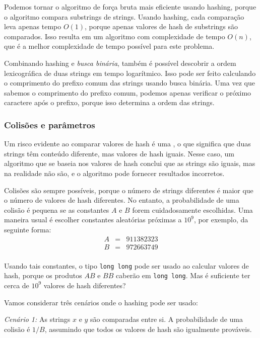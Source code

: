Podemos tornar o algoritmo de força bruta mais eficiente usando hashing, porque o algoritmo compara substrings de strings. Usando hashing, cada comparação leva apenas tempo $O(1)$, porque apenas valores de hash de substrings são comparados. Isso resulta em um algoritmo com complexidade de tempo $O(n)$, que é a melhor complexidade de tempo possível para este problema.

Combinando hashing e \emph{busca binária}, também é possível descobrir a ordem lexicográfica de duas strings em tempo logarítmico. Isso pode ser feito calculando o comprimento do prefixo comum das strings usando busca binária. Uma vez que sabemos o comprimento do prefixo comum, podemos apenas verificar o próximo caractere após o prefixo, porque isso determina a ordem das strings.

\subsubsection*{Colisões e parâmetros}


Um risco evidente ao comparar valores de hash é uma , o que significa que duas strings têm conteúdo diferente, mas valores de hash iguais. Nesse caso, um algoritmo que se baseia nos valores de hash conclui que as strings são iguais, mas na realidade não são, e o algoritmo pode fornecer resultados incorretos.

Colisões são sempre possíveis, porque o número de strings diferentes é maior que o número de valores de hash diferentes. No entanto, a probabilidade de uma colisão é pequena se as constantes $A$ e $B$ forem cuidadosamente escolhidas. Uma maneira usual é escolher constantes aleatórias próximas a $10^9$, por exemplo, da seguinte forma:
\[
\begin{array}{lcl}
A & = & 911382323 \\
B & = & 972663749 \\
\end{array}
\]

Usando tais constantes, o tipo \texttt{long long} pode ser usado ao calcular valores de hash, porque os produtos $AB$ e $BB$ caberão em \texttt{long long}. Mas é suficiente ter cerca de $10^9$ valores de hash diferentes?

Vamos considerar três cenários onde o hashing pode ser usado:

\textit{Cenário 1:} As strings $x$ e $y$ são comparadas entre si. A probabilidade de uma colisão é $1/B$, assumindo que todos os valores de hash são igualmente prováveis.


